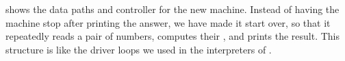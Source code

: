  shows the data paths and controller for the new  machine.
Instead of having the machine stop after printing the answer, we have made it start over, so that it repeatedly reads a pair of numbers, computes their , and prints the result.
This structure is like the driver loops we used in the interpreters of .
